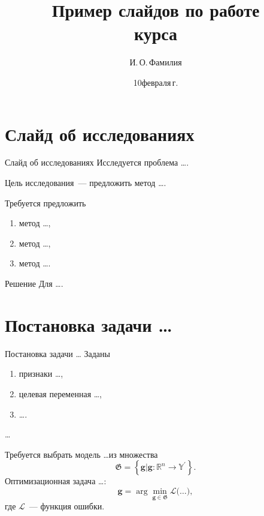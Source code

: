 \documentclass[10pt,pdf,hyperref={unicode}]{beamer}
\title[Пример слайдов по работе]{Пример слайдов по работе \\ курса}
\author{И.\,О.\,Фамилия}
\institute[]{Московский физико-технический институт}
\date[2022]{\small 10\;февраля\;2022\,г.}
\begin{document}
\begin{frame}
\titlepage
\end{frame}

\section{Слайд об исследованиях}
\begin{frame}{Слайд об исследованиях}
\bigskip
Исследуется проблема \ldots.
\begin{block}{Цель исследования~---}
предложить метод \ldots.
\end{block}
\begin{block}{Требуется предложить}
\justifying
\begin{enumerate}[1)]
\item метод \ldots,
\item метод \ldots,
\item метод \ldots.
\end{enumerate}
\end{block}
\begin{block}{Решение}
Для \ldots.
\end{block}
\end{frame}

\section{Постановка задачи \ldots}
\begin{frame}{Постановка задачи \ldots}
Заданы
\begin{enumerate}[1)]
    \item признаки \ldots,
    \item целевая переменная \ldots,
    \item \ldots.
\end{enumerate}

\ldots

\bigskip

Требуется выбрать модель \ldots из множества
\[
	\mathfrak{G} = \left\{\mathbf{g}| \mathbf{g}:\mathbb{R}^{n} \to \mathbb{Y}^\prime\right\}.
\]
Оптимизационная задача \ldots:
\[
	\mathbf{g} = \arg\min_{\mathbf{g} \in \mathfrak{G}} \mathcal{L}\bigr(\ldots\bigl),
\]
где $\mathcal{L}$~--- функция ошибки.

\bigskip
{}
\end{frame}
\end{document}
